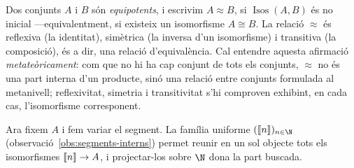 \begin{definicio}[Equipotència]\label{def:equipotencia}
Dos conjunts \(A\) i \(B\) són \emph{equipotents}, i escrivim \(A\approx
B\), si \(\operatorname{Isos}(A,B)\) és no inicial ---equivalentment, si
existeix un isomorfisme \(A\cong B\). La relació \(\approx\) és reflexiva
(la identitat), simètrica (la inversa d'un isomorfisme) i transitiva (la
composició), és a dir, una relació d'equivalència. Cal entendre aquesta
afirmació \emph{metateòricament}: com que no hi ha cap conjunt de tots els
conjunts, \(\approx\) no és una part interna d'un producte, sinó una
relació entre conjunts formulada al metanivell; reflexivitat, simetria i
transitivitat s'hi comproven exhibint, en cada cas, l'isomorfisme
corresponent.
\end{definicio}

Ara fixem \(A\) i fem variar el segment. La família uniforme
\((\seg{n})_{n\in\N}\) (observació~\ref{obs:segments-interns}) permet
reunir en un sol objecte tots els isomorfismes \(\llbracket n\rrbracket\to A\), i
projectar-los sobre \(\N\) dona la part buscada.

